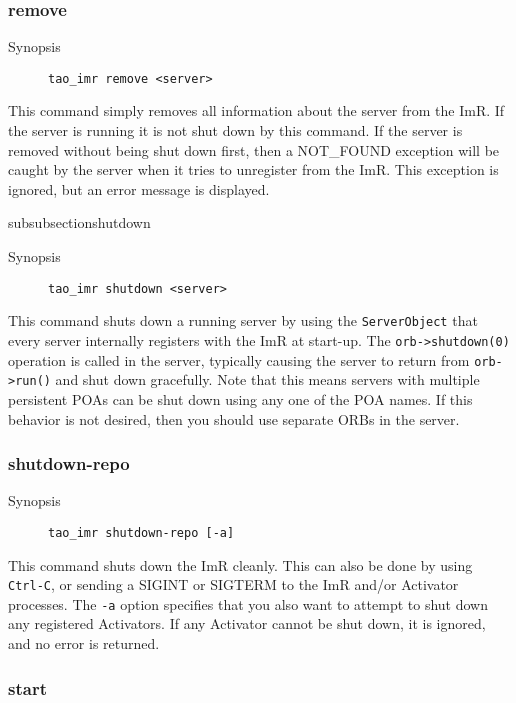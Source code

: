 \subsubsection{remove}

\begin{description}
    \item [Synopsis] {\tt tao\_imr remove <server>}
\end{description}

This command simply removes all information about the server from the ImR.
If the server is running it is not shut down by this command. If the server is
removed without being shut down first, then a NOT_FOUND exception will
be caught by the server when it tries to unregister from the ImR. This exception
is ignored, but an error message is displayed.

subsubsection{shutdown}

\begin{description}
    \item [Synopsis] {\tt tao\_imr shutdown <server>}
\end{description}

This command shuts down a running server by using the {\tt ServerObject}
that every server internally registers with the ImR at start-up. The
{\tt orb->shutdown(0)} operation is called in the server, typically causing
the server to return from {\tt orb->run()} and shut down gracefully. Note
that this means servers with multiple persistent POAs can be shut down
using any one of the POA names. If this behavior is not desired, then you
should use separate ORBs in the server.

\subsubsection{shutdown-repo}

\begin{description}
    \item [Synopsis] {\tt tao\_imr shutdown-repo [-a]}
\end{description}

This command shuts down the ImR cleanly. This can also be done by
using {\tt Ctrl-C}, or sending a SIGINT or SIGTERM to the ImR and/or
Activator processes.   The {\tt -a} option specifies that you also want to
 attempt to shut down any registered Activators. If any Activator
cannot be shut down, it is ignored, and no error is returned.

\subsubsection{start}

